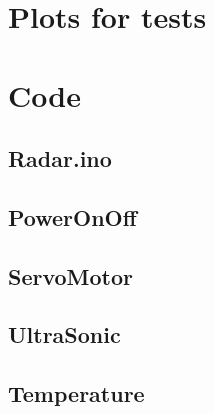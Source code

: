 \begin{appendices}

\appendix
\chapter{Plots for tests}


\newpage


\chapter{Code}
\section{Radar.ino}


\newpage

\section{PowerOnOff}
\label{appendix:PowerOnOff}



\newpage

\section{ServoMotor}
\label{appendix:ServoMotor}



\newpage

\section{UltraSonic}
\label{appendix:UltraSonic}

\newpage


\newpage

\section{Temperature}
\label{appendix:Temperature}

\newpage



\end{appendices}

